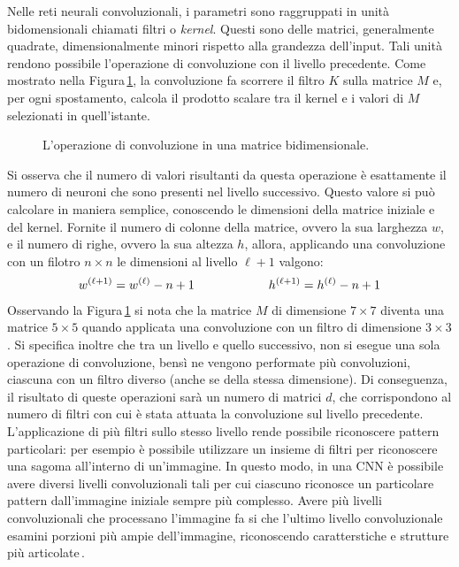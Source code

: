Nelle reti neurali convoluzionali, i parametri sono raggruppati in unità bidomensionali chiamati filtri o \textit{kernel}. Questi sono delle matrici, generalmente quadrate, dimensionalmente minori rispetto alla grandezza dell'input. Tali unità rendono possibile l'operazione di convoluzione con il livello precedente. Come mostrato nella Figura\,\ref{fig:convolution-operation}, la convoluzione fa scorrere il filtro $K$ sulla matrice $M$ e, per ogni spostamento, calcola il prodotto scalare tra il kernel e i valori di $M$ selezionati in quell'istante.
% 
\begin{figure}[!b]
    \centering
    
    \caption[L'operazione di convoluzione in una matrice bidimensionale.]{L'operazione di convoluzione in una matrice bidimensionale.}\label{fig:convolution-operation}
\end{figure}
% 
Si osserva che il numero di valori risultanti da questa operazione è esattamente il numero di neuroni che sono presenti nel livello successivo. Questo valore si può calcolare in maniera semplice, conoscendo le dimensioni della matrice iniziale e del kernel. Fornite il numero di colonne della matrice, ovvero la sua larghezza $w$, e il numero di righe, ovvero la sua altezza $h$, allora, applicando una convoluzione con un filotro $n \times n$ le dimensioni al livello $\ell + 1$ valgono:
% 
\begin{gather*}
    w^{(\ell + 1)} = w^{(\ell)} - n + 1
    \hspace{60px}
    h^{(\ell + 1)} = h^{(\ell)} - n + 1
\end{gather*}
% 
Osservando la Figura\,\ref{fig:convolution-operation} si nota che la matrice $M$ di dimensione $7\times 7$ diventa una matrice $5 \times 5$ quando applicata una convoluzione con un filtro di dimensione $3\times 3$. Si specifica inoltre che tra un livello e quello successivo, non si esegue una sola operazione di convoluzione, bensì ne vengono performate più convoluzioni, ciascuna con un filtro diverso (anche se della stessa dimensione). Di conseguenza, il risultato di queste operazioni sarà un numero di matrici $d$, che corrispondono al numero di filtri con cui è stata attuata la convoluzione sul livello precedente. L'applicazione di più filtri sullo stesso livello rende possibile riconoscere pattern particolari: per esempio è possibile utilizzare un insieme di filtri per riconoscere una sagoma all'interno di un'immagine. In questo modo, in una \acs{CNN} è possibile avere diversi livelli convoluzionali tali per cui ciascuno riconosce un particolare pattern dall'immagine iniziale sempre più complesso. Avere più livelli convoluzionali che processano l'immagine fa si che l'ultimo livello convoluzionale esamini porzioni più ampie dell'immagine, riconoscendo caratterstiche e strutture più articolate\,\cite{aggarwal2018neural, wu2017introduction}.
